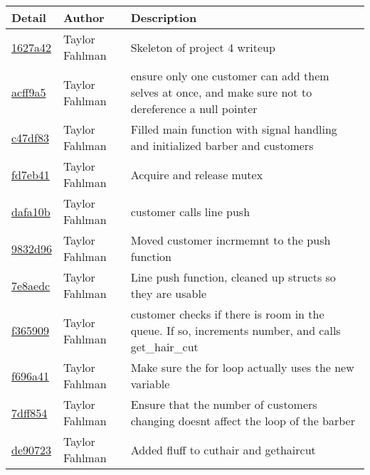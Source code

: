 \begin{tabular}{l l l}\textbf{Detail} & \textbf{Author} & \textbf{Description}\\\hline
\href{https://github.com/fahlmant/cs444/commit/1627a4248c49937b98d1170fd66da4c1edff7ffa}{1627a42} & Taylor Fahlman & Skeleton of project 4 writeup\\\hline
\href{https://github.com/fahlmant/cs444/commit/acff9a5dd3f37331941e738ed451fdea6d24898c}{acff9a5} & Taylor Fahlman & ensure only one customer can add them selves at once, and make sure not to dereference a null pointer\\\hline
\href{https://github.com/fahlmant/cs444/commit/c47df83c33858ae9f3209159dbb61fd03dfff50b}{c47df83} & Taylor Fahlman & Filled main function with signal handling and initialized barber and customers\\\hline
\href{https://github.com/fahlmant/cs444/commit/fd7eb4166f01deda12959c4d0c40fae1ae3b2ec3}{fd7eb41} & Taylor Fahlman & Acquire and release mutex\\\hline
\href{https://github.com/fahlmant/cs444/commit/dafa10b7238c79ecd900e8788a383271aa7af3bf}{dafa10b} & Taylor Fahlman & customer calls line push\\\hline
\href{https://github.com/fahlmant/cs444/commit/9832d96404a36e464718f1ede7c89eb6720c8d41}{9832d96} & Taylor Fahlman & Moved customer incrmemnt to the push function\\\hline
\href{https://github.com/fahlmant/cs444/commit/7e8aedcdf47eeb14060dd956bd51559cb1c3bd2c}{7e8aedc} & Taylor Fahlman & Line push function, cleaned up structs so they are usable\\\hline
\href{https://github.com/fahlmant/cs444/commit/f36590940927dc233ec5ceec23c002e4a8f09e20}{f365909} & Taylor Fahlman & customer checks if there is room in the queue. If so, increments number, and calls get_hair_cut\\\hline
\href{https://github.com/fahlmant/cs444/commit/f696a4130452abc0fbdd3dfc80abcbd2396ec7e8}{f696a41} & Taylor Fahlman & Make sure the for loop actually uses the new variable\\\hline
\href{https://github.com/fahlmant/cs444/commit/7dff854b73aa058e96e2c074ca081c0883eeed2d}{7dff854} & Taylor Fahlman & Ensure that the number of customers changing doesnt affect the loop of the barber\\\hline
\href{https://github.com/fahlmant/cs444/commit/de907234be86116ce95b1674d6a89515a34bc2ff}{de90723} & Taylor Fahlman & Added fluff to cuthair and gethaircut\\\hline

\end{tabular}
